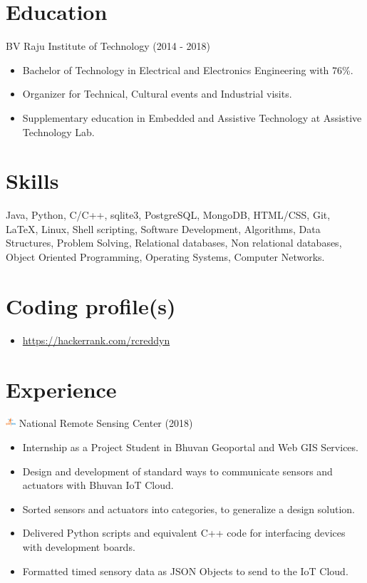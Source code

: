 \documentclass{article}
\begin{document}
\begin{multicols}{2}
\section*{Education}
 BV Raju Institute of Technology (2014 - 2018)
\begin{itemize}
\item \small Bachelor of Technology in Electrical and Electronics Engineering with 76\%.
\item \small Organizer for Technical, Cultural events and Industrial visits.
\item \small Supplementary education in Embedded and Assistive Technology  at Assistive Technology Lab.
\end{itemize}

\section*{Skills}
\begin{flushleft}
Java, Python, C/C++, sqlite3, PostgreSQL, MongoDB, HTML/CSS, Git, \LaTeX, Linux, Shell scripting, Software Development, Algorithms, Data Structures, Problem Solving, Relational databases, Non relational databases, Object Oriented Programming, Operating Systems, Computer Networks.
\end{flushleft}


\section*{Coding profile(s)}
\begin{itemize}
\item \url {https://hackerrank.com/rcreddyn}
\end{itemize}

\section*{Experience}
\includegraphics[width=14px]{isro.png} National Remote Sensing Center (2018)
\begin{itemize}
\item \small Internship as a Project Student in Bhuvan Geoportal and Web GIS Services.
\item \small Design and development of standard ways to communicate sensors and actuators with Bhuvan IoT Cloud.
\item \small Sorted sensors and actuators into categories, to generalize a design solution.
\item \small Delivered Python scripts and equivalent C++ code for interfacing devices with development boards.
\item \small Formatted timed sensory data as JSON Objects to send to the IoT Cloud. 
\end{itemize}


\end{multicols}
\end{document}
